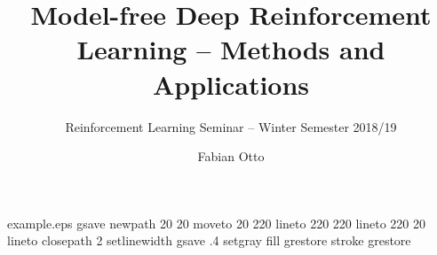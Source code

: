 %
%
%
%
%
\begin{filecontents*}{example.eps}
    gsave
    newpath
    20 20 moveto
    20 220 lineto
    220 220 lineto
    220 20 lineto
    closepath
    2 setlinewidth
    gsave
    .4 setgray fill
    grestore
    stroke
    grestore
\end{filecontents*}
%
\RequirePackage{fix-cm}
%
\documentclass{svjour3}                     %
%
\smartqed  %
%
\usepackage{graphicx}
\usepackage{amssymb}
\usepackage{amsmath}
\usepackage[final]{pdfpages}
%
%
%
%
%

\newcommand{\argmax}[1]{\underset{#1}{\operatorname{arg}\,\operatorname{max}}\;}



    \title{Model-free Deep Reinforcement Learning -- Methods and Applications}
    \subtitle{Reinforcement Learning Seminar -- Winter Semester 2018/19}

    \author{Fabian Otto}


